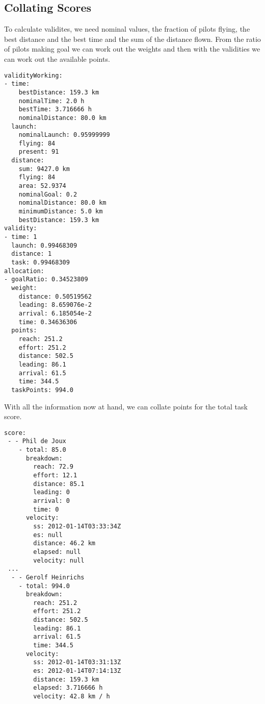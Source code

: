 \documentclass[gap.tex]{subfiles}
\begin{document}
\newpage
\subsection{Collating Scores}

To calculate validites, we need nominal values, the fraction of pilots flying,
the best distance and the best time and the sum of the distance flown. From the
ratio of pilots making goal we can work out the weights and then with the
validities we can work out the available points.

\begin{lstlisting}[caption={The validities, weights and available points for the task, \texttt{*.gap-point.yaml}}]
validityWorking:
- time:
    bestDistance: 159.3 km
    nominalTime: 2.0 h
    bestTime: 3.716666 h
    nominalDistance: 80.0 km
  launch:
    nominalLaunch: 0.95999999
    flying: 84
    present: 91
  distance:
    sum: 9427.0 km
    flying: 84
    area: 52.9374
    nominalGoal: 0.2
    nominalDistance: 80.0 km
    minimumDistance: 5.0 km
    bestDistance: 159.3 km
validity:
- time: 1
  launch: 0.99468309
  distance: 1
  task: 0.99468309
allocation:
- goalRatio: 0.34523809
  weight:
    distance: 0.50519562
    leading: 8.659076e-2
    arrival: 6.185054e-2
    time: 0.34636306
  points:
    reach: 251.2
    effort: 251.2
    distance: 502.5
    leading: 86.1
    arrival: 61.5
    time: 344.5
  taskPoints: 994.0
\end{lstlisting}

\newpage
With all the information now at hand, we can collate points for the total task
score.

\begin{lstlisting}[caption={The breakdown of the score and velocity over the task, \texttt{*.gap-point.yaml}}]
score:
 - - Phil de Joux
    - total: 85.0
      breakdown:
        reach: 72.9
        effort: 12.1
        distance: 85.1
        leading: 0
        arrival: 0
        time: 0
      velocity:
        ss: 2012-01-14T03:33:34Z
        es: null
        distance: 46.2 km
        elapsed: null
        velocity: null
 ...
  - - Gerolf Heinrichs
    - total: 994.0
      breakdown:
        reach: 251.2
        effort: 251.2
        distance: 502.5
        leading: 86.1
        arrival: 61.5
        time: 344.5
      velocity:
        ss: 2012-01-14T03:31:13Z
        es: 2012-01-14T07:14:13Z
        distance: 159.3 km
        elapsed: 3.716666 h
        velocity: 42.8 km / h
\end{lstlisting}
\end{document}
